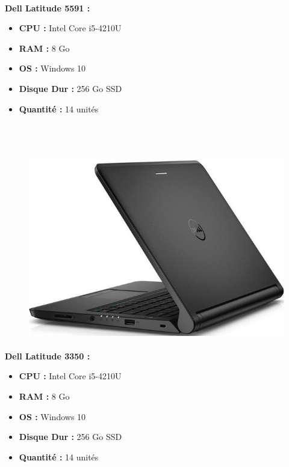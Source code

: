 \documentclass[11pt,a4paper,oneside]{article}
\begin{document}
\paragraph{}\textbf{Dell Latitude 5591 :} \\
\begin{itemize}
\item \textbf{CPU :} Intel Core i5-4210U
\item \textbf{RAM :} 8 Go
\item \textbf{OS :} Windows 10
\item \textbf{Disque Dur :} 256 Go SSD
\item \textbf{Quantité :} 14 unités
\\ \\ \\ \\
\end{itemize}
\begin{figure}
\includegraphics[scale=0.4]{Ressources/Materiel/L3350.jpg}\vspace{-2cm}
\end{figure}
\paragraph{}\textbf{Dell Latitude 3350 :} \\
\begin{itemize}
\item \textbf{CPU :} Intel Core i5-4210U
\item \textbf{RAM :} 8 Go
\item \textbf{OS :} Windows 10
\item \textbf{Disque Dur :} 256 Go SSD
\item \textbf{Quantité :} 14 unités
\\ \\ \\ \\
\end{itemize}
\newpage
\end{document}
